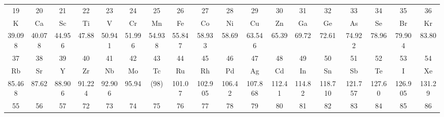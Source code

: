 \documentclass[10pt,landscape]{article}
\begin{document}
\begin{center}
\begin{tabular}{|c*{16}{|c}|c|}
        \small 19      & \small 20      & \small 21      & \small 22     & \small 23      & \small 24     & \small 25      & \small 26     & \small 27      & \small 28     & \small 29      & \small 30     & \small 31      & \small 32      & \small 33      & \small 34     & \small 35      & \small 36                         \\
        K              & Ca             & Sc             & Ti            & V              & Cr            & Mn             & Fe            & Co             & Ni            & Cu             & Zn            & Ga             & Ge             & As             & Se            & Br             & Kr                                \\[-2mm]
        \small 39.098  & \small 40.078  & \small 44.956  & \small 47.88  & \small 50.941  & \small 51.996 & \small 54.938  & \small 55.847 & \small 58.933  & \small 58.69  & \small 63.546  & \small 65.39  & \small 69.72   & \small 72.61   & \small 74.922  & \small 78.96  & \small 79.904  & \small 83.80                      \\[-1mm]
        \hline
        \small 37      & \small 38      & \small 39      & \small 40     & \small 41      & \small 42     & \small 43      & \small 44     & \small 45      & \small 46     & \small 47      & \small 48     & \small 49      & \small 50      & \small 51      & \small 52     & \small 53      & \small 54                         \\[-1mm]
        Rb             & Sr             & Y              & Zr            & Nb             & Mo            & Tc             & Ru            & Rh             & Pd            & Ag             & Cd            & In             & Sn             & Sb             & Te            & I              & Xe                                \\[-2mm]
        \small 85.468  & \small 87.62   & \small 88.906  & \small 91.224 & \small 92.906  & \small 95.94  & \small (98)    & \small 101.07 & \small 102.905 & \small 106.42 & \small 107.868 & \small 112.41 & \small 114.82  & \small 118.710 & \small 121.757 & \small 127.60 & \small 126.905 & \small 131.29                     \\[-1mm]
        \hline
        \small 55      & \small 56      & \small 57      & \small 72     & \small 73      & \small 74     & \small 75      & \small 76     & \small 77      & \small 78     & \small 79      & \small 80     & \small 81      & \small 82      & \small 83      & \small 84     & \small 85      & \small 86                         \\[-1mm]

\end{tabular}
\end{center}
\end{document}
